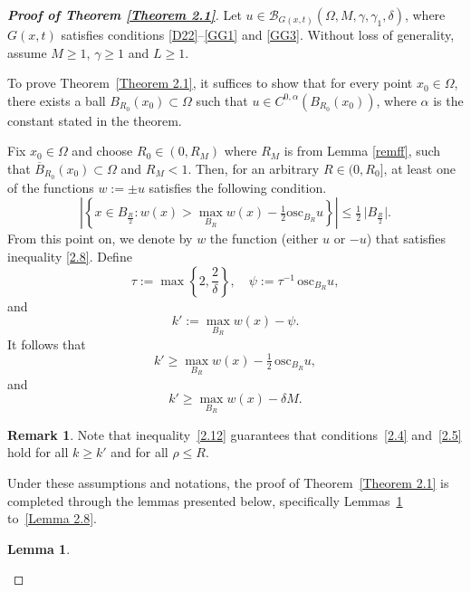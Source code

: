\documentclass[10pt,reqno]{amsart}
\newcommand *\w{^\wedge}
\theoremstyle{definition}
\newtheorem{lemma}[theorem]{Lemma}
\newtheorem{remark}[theorem]{Remark}
\numberwithin{equation}{section}
\begin{document}
\begin{proof}[\textbf{Proof of Theorem \ref{Theorem 2.1}}]
Let $u \in \mathcal{B}_{G(x,t)}(\Omega, M, \gamma, \gamma_1, \delta)$, where $G(x,t)$ satisfies conditions \eqref{D22}--\eqref{GG1} and \eqref{GG3}. Without loss of generality, assume $M \geq 1$, $\gamma \geq 1$ and $L\geq 1$.

To prove Theorem~\ref{Theorem 2.1}, it suffices to show that for every point $x_0 \in \Omega$, there exists a ball $B_{R_0}(x_0) \subset \Omega$ such that $u \in C^{0,\alpha}(B_{R_0}(x_0))$, where $\alpha$ is the constant stated in the theorem.

Fix $x_0 \in \Omega$ and choose $R_0 \in (0, R_M)$ where $R_M$ is from Lemma \ref{remff}, such that $\overline{B}_{R_0}(x_0) \subset \Omega$ and $R_M < 1$. Then, for an arbitrary $R \in (0, R_0]$, at least one of the functions $w := \pm u$ satisfies the following condition.
\begin{equation}\label{2.8}
\left\vert\left\lbrace x \in B_{\frac{R}{2}} : w(x) > \max_{B_R} w(x) - \tfrac{1}{2} \mathrm{osc}_{B_R} u \right\rbrace\right\vert \leq \tfrac{1}{2} \, \vert B_{\frac{R}{2}}\vert.
\end{equation}
From this point on, we denote by $w$ the function (either $u$ or $-u$) that satisfies inequality \eqref{2.8}. Define
\begin{equation}\label{2.9}
\tau := \max\left\{2, \frac{2}{\delta} \right\}, \quad \psi := \tau^{-1} \, \mathrm{osc}_{B_R} u,
\end{equation}
and
\begin{equation}\label{2.10}
k' := \max_{B_R} w(x) - \psi.
\end{equation}
It follows that
\begin{equation}\label{2.11}
k' \geq \max_{B_R} w(x) - \tfrac{1}{2} \, \mathrm{osc}_{B_R} u,
\end{equation}
and
\begin{equation}\label{2.12}
k' \geq \max_{B_R} w(x) - \delta M.
\end{equation}
\begin{remark}
Note that inequality~\eqref{2.12} guarantees that conditions~\eqref{2.4} and~\eqref{2.5} hold for all \( k \geq k' \) and for all \( \rho \leq R \).
\end{remark}
Under these assumptions and notations, the proof of Theorem~\ref{Theorem 2.1} is completed through the lemmas presented below, specifically Lemmas~\ref{Lemma 2.5} to~\ref{Lemma 2.8}.
\begin{lemma}\label{Lemma 2.5}

\end{lemma}
\end{proof}
\end{document}
